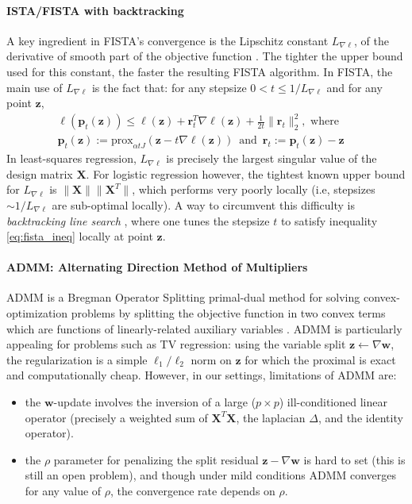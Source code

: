 \paragraph{ISTA/FISTA with backtracking}
A key ingredient in FISTA's convergence is the Lipschitz
constant $L_{\nabla \ell}$, of the derivative of smooth part of the objective function
. The tighter the upper bound used for this constant,
the faster the resulting FISTA algorithm. In FISTA, the main use of 
$L_{\nabla \ell}$ is the fact that: for any
stepsize $0 < t \le 1/L_{\nabla \ell}$ and for any point $\mathbf{z}$,
\begin{equation}%
  \begin{gathered}
    \ell(\mathbf{p}_{t}(\mathbf{z})) \le
    \ell(\mathbf{z}) + \mathbf{r}_{t}^T\nabla
    \ell(\mathbf{z}) + \frac{1}{2t} \|\mathbf{r}_{t}\|_{2}^2,
    \text{  where} \quad\\
    \mathbf{p}_{t}(\mathbf{z}) := \textrm{prox}_{\alpha t J}(\mathbf{z} - t
    \nabla \ell(\mathbf{z})) \,\text{  and  }\,
    \mathbf{r}_{t} :=
    \mathbf{p}_{t}(\mathbf{z}) - \mathbf{z} \quad
  \end{gathered}
  \label{eq:fista_ineq}
\end{equation}
In least-squares regression, $L_{\nabla \ell}$ is precisely the largest
singular value of the design matrix $\mathbf{X}$.
For logistic
regression however, the tightest known upper bound for
$L_{\nabla \ell}$ is $\|\mathbf{X}\|\|\mathbf{X}^T\|$,
which performs very poorly locally (i.e, stepsizes $\sim 1 / L_{\nabla \ell}$ are
sub-optimal locally). A way to circumvent this difficulty is
\emph{backtracking line search} \citep{beck2009a}, where one tunes the
stepsize $t$ to satisfy inequality \eqref{eq:fista_ineq} locally at
point $\mathbf{z}$. 


\paragraph{ADMM: Alternating Direction Method of Multipliers}
ADMM is a Bregman Operator Splitting primal-dual method for
solving convex-optimization problems by splitting the
objective function in two convex terms which are functions of linearly-related auxiliary variables
\citep{boyd2010}.  ADMM is particularly appealing for problems such as TV
regression: using the variable split $\mathbf{z}
\leftarrow \nabla \mathbf{w}$, the regularization is a simple $\ell_{1}/\ell_2$
norm on $\mathbf{z}$ for which the proximal is exact and computationally
cheap. However, in our settings, limitations of ADMM are:
\begin{itemize}
\item the $\mathbf{w}$-update involves the inversion of a large ($p \times p$)
  ill-conditioned linear operator (precisely a weighted sum of
  $\mathbf{X}^T\mathbf{X}$, the laplacian $\Delta$, and the identity
  operator).
\item the $\rho$ parameter for penalizing the split
  residual $\mathbf{z} - \nabla \mathbf{w}$ is hard to set (this is still an
  open problem), and though under mild conditions ADMM
  converges for any value of $\rho$, the convergence rate depends
  on $\rho$.
\end{itemize}

